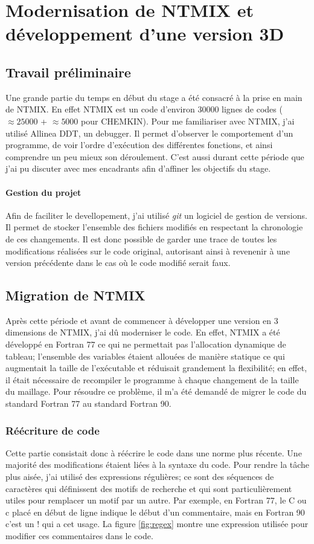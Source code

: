\section{Modernisation de NTMIX et développement d'une version 3D}
\label{sec:part1}

\subsection{Travail préliminaire}
Une grande partie du temps en début du stage a été consacré à la prise en main de NTMIX. En effet NTMIX est un code d'environ 30000 lignes de codes ($\approx 25000$ + $\approx 5000$ pour CHEMKIN). Pour me familiariser avec NTMIX, j'ai utilisé Allinea DDT, un debugger. Il permet d'observer le comportement d'un programme, de voir l'ordre d'exécution des différentes fonctions, et ainsi comprendre un peu mieux son déroulement. C'est aussi durant cette période que j'ai pu discuter avec mes encadrants afin d'affiner les objectifs du stage.

\paragraph{Gestion du projet}Afin de faciliter le devellopement, j'ai utilisé \textit{git} un logiciel de gestion de versions. Il permet de stocker l'ensemble des fichiers modifiés en respectant la chronologie de ces changements. Il est donc possible de garder une trace de toutes les modifications réalisées sur le code original, autorisant ainsi à revenenir à une version précédente dans le cas où le code modifié serait faux.
 
\subsection{Migration de NTMIX}
Après cette période et avant de commencer à développer une version en 3 dimensions de NTMIX, j'ai dû moderniser le code. En effet, NTMIX a été développé en Fortran 77 ce qui ne permettait pas l'allocation dynamique de tableau; l'ensemble des variables étaient allouées de manière statique ce qui augmentait la taille de l'exécutable et réduisait grandement la flexibilité; en effet, il était nécessaire de recompiler le programme à chaque changement de la taille du maillage. Pour résoudre ce problème, il m'a été demandé de migrer le code du standard Fortran 77 au standard Fortran 90.

\subsubsection{Réécriture de code}Cette partie consistait donc à réécrire le code dans une norme plus récente. Une majorité des modifications étaient liées à la syntaxe du code. Pour rendre la tâche plus aisée, j'ai utilisé des expressions régulières; ce sont des séquences de caractères qui définissent des motifs de recherche et qui sont particulièrement utiles pour remplacer un motif par un autre. Par exemple, en Fortran 77, le C ou c placé en début de ligne indique le début d'un commentaire, mais en Fortran 90 c'est un ! qui a cet usage. La figure \ref{fig:regex} montre une expression utilisée pour modifier ces commentaires dans le code.

